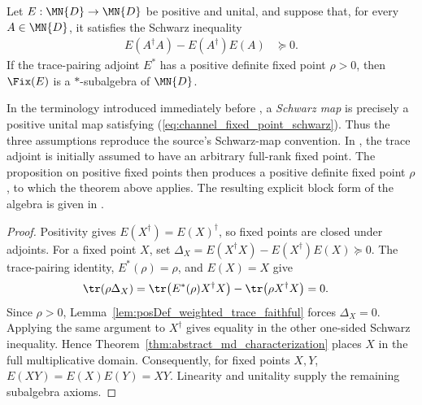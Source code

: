 \begin{theorem}
    \label{thm:fixedPointsStarSubalgebra}
    \leanok
    Let $E:\MN{D}\to\MN{D}$ be positive and unital, and suppose that, for
    every $A\in\MN{D}$, it satisfies the Schwarz inequality
    \begin{align}
        E(A^\dagger A)-E(A^\dagger)E(A)
         & \succeq0.
        \label{eq:channel_fixed_point_schwarz}
    \end{align}
    If the trace-pairing adjoint $E^*$ has a positive definite fixed point
    $\rho>0$, then $\Fix(E)$ is a $*$-subalgebra of $\MN{D}$.

    In the terminology introduced immediately before
    \cite[Example~5.3]{Wolf2012Quantum}, a \emph{Schwarz map} is precisely a
    positive unital map satisfying (\ref{eq:channel_fixed_point_schwarz}).
    Thus the three assumptions reproduce the source's Schwarz-map convention.
    In \cite[Theorem~6.12]{Wolf2012Quantum}, the trace adjoint is initially
    assumed to have an arbitrary full-rank fixed point. The proposition on
    positive fixed points then produces a positive definite fixed point
    $\rho$, to which the theorem above applies. The resulting explicit block
    form of the algebra is given in
    \cite[Equation~(1.39)]{Wolf2012Quantum}.
\end{theorem}

\begin{proof}\leanok
    Positivity gives $E(X^\dagger)=E(X)^\dagger$, so fixed points are closed
    under adjoints. For a fixed point $X$, set
    $\Delta_X=E(X^\dagger X)-E(X^\dagger)E(X)\succeq0$.
    The trace-pairing identity, $E^*(\rho)=\rho$, and $E(X)=X$ give
    \begin{align}
        \tr(\rho\Delta_X)
         & =\tr\!\left(E^*(\rho)X^\dagger X\right)
        -\tr\!\left(\rho X^\dagger X\right)
        =0.
        \notag
    \end{align}
    Since $\rho>0$, Lemma~\ref{lem:posDef_weighted_trace_faithful}
    forces $\Delta_X=0$. Applying the same argument to $X^\dagger$ gives
    equality in the other one-sided Schwarz inequality. Hence
    Theorem~\ref{thm:abstract_md_characterization} places $X$ in the full
    multiplicative domain. Consequently, for fixed points $X,Y$,
    $E(XY)=E(X)E(Y)=XY$. Linearity and unitality supply the remaining
    subalgebra axioms.
\end{proof}

